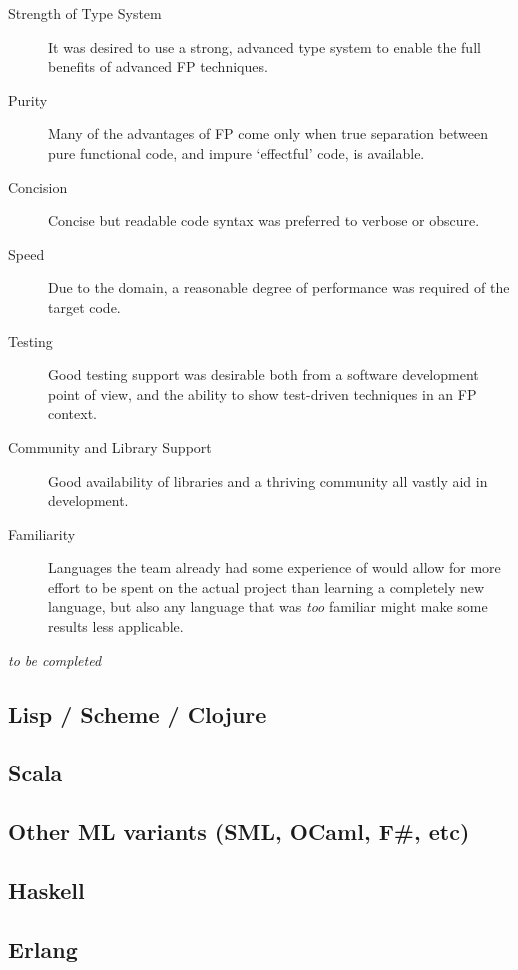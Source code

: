 \begin{description}
	\item[Strength of Type System] It was desired to use a strong, advanced type system to enable the full benefits of advanced FP techniques.
	\item[Purity] Many of the advantages of FP come only when true separation between pure functional code, and impure `effectful' code, is available.\cite[-10em]{hudak1989conception}
	\item[Concision] Concise but readable code syntax was preferred to verbose or obscure.
	\item[Speed] Due to the domain, a reasonable degree of performance was required of the target code.
	\item[Testing] Good testing support was desirable both from a software development point of view, and the ability to show test-driven techniques in an FP context.
	\item[Community and Library Support] Good availability of libraries and a thriving community all vastly aid in development.
	\item[Familiarity] Languages the team already had some experience of would allow for more effort to be spent on the actual project than learning a completely new language, but also any language that was \emph{too} familiar might make some results less applicable.
\end{description}

\emph{to be completed}

\subsection{Lisp / Scheme / Clojure}
\subsection{Scala}
\subsection{Other ML variants (SML, OCaml, F\#, etc)}
\subsection{Haskell}
\subsection{Erlang}
